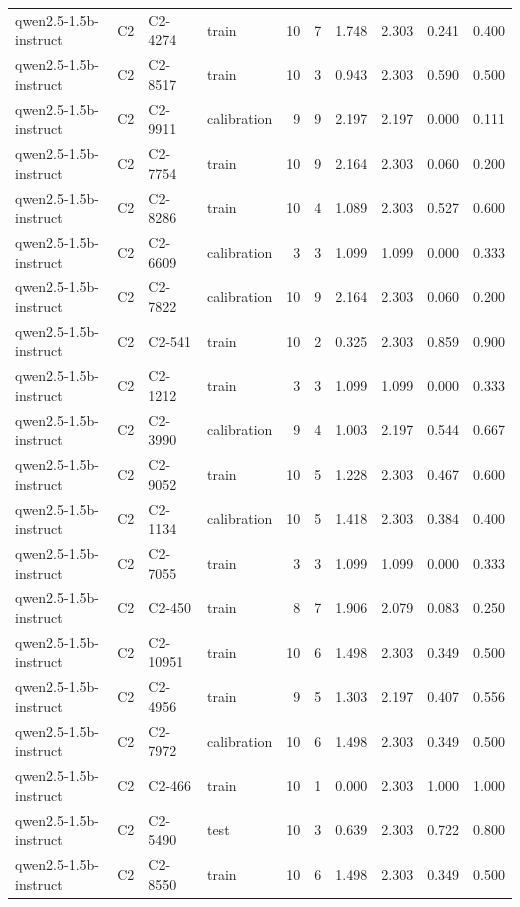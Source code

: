 \begin{table}
\begin{tabular}{llllrrrrrr}
qwen2.5-1.5b-instruct & C2 & C2-4274 & train & 10 & 7 & 1.748 & 2.303 & 0.241 & 0.400 \\
qwen2.5-1.5b-instruct & C2 & C2-8517 & train & 10 & 3 & 0.943 & 2.303 & 0.590 & 0.500 \\
qwen2.5-1.5b-instruct & C2 & C2-9911 & calibration & 9 & 9 & 2.197 & 2.197 & 0.000 & 0.111 \\
qwen2.5-1.5b-instruct & C2 & C2-7754 & train & 10 & 9 & 2.164 & 2.303 & 0.060 & 0.200 \\
qwen2.5-1.5b-instruct & C2 & C2-8286 & train & 10 & 4 & 1.089 & 2.303 & 0.527 & 0.600 \\
qwen2.5-1.5b-instruct & C2 & C2-6609 & calibration & 3 & 3 & 1.099 & 1.099 & 0.000 & 0.333 \\
qwen2.5-1.5b-instruct & C2 & C2-7822 & calibration & 10 & 9 & 2.164 & 2.303 & 0.060 & 0.200 \\
qwen2.5-1.5b-instruct & C2 & C2-541 & train & 10 & 2 & 0.325 & 2.303 & 0.859 & 0.900 \\
qwen2.5-1.5b-instruct & C2 & C2-1212 & train & 3 & 3 & 1.099 & 1.099 & 0.000 & 0.333 \\
qwen2.5-1.5b-instruct & C2 & C2-3990 & calibration & 9 & 4 & 1.003 & 2.197 & 0.544 & 0.667 \\
qwen2.5-1.5b-instruct & C2 & C2-9052 & train & 10 & 5 & 1.228 & 2.303 & 0.467 & 0.600 \\
qwen2.5-1.5b-instruct & C2 & C2-1134 & calibration & 10 & 5 & 1.418 & 2.303 & 0.384 & 0.400 \\
qwen2.5-1.5b-instruct & C2 & C2-7055 & train & 3 & 3 & 1.099 & 1.099 & 0.000 & 0.333 \\
qwen2.5-1.5b-instruct & C2 & C2-450 & train & 8 & 7 & 1.906 & 2.079 & 0.083 & 0.250 \\
qwen2.5-1.5b-instruct & C2 & C2-10951 & train & 10 & 6 & 1.498 & 2.303 & 0.349 & 0.500 \\
qwen2.5-1.5b-instruct & C2 & C2-4956 & train & 9 & 5 & 1.303 & 2.197 & 0.407 & 0.556 \\
qwen2.5-1.5b-instruct & C2 & C2-7972 & calibration & 10 & 6 & 1.498 & 2.303 & 0.349 & 0.500 \\
qwen2.5-1.5b-instruct & C2 & C2-466 & train & 10 & 1 & 0.000 & 2.303 & 1.000 & 1.000 \\
qwen2.5-1.5b-instruct & C2 & C2-5490 & test & 10 & 3 & 0.639 & 2.303 & 0.722 & 0.800 \\
qwen2.5-1.5b-instruct & C2 & C2-8550 & train & 10 & 6 & 1.498 & 2.303 & 0.349 & 0.500 \\

\end{tabular}
\end{table}
